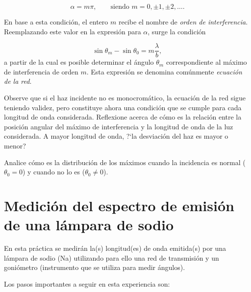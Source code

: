 \documentclass[epj]{svjour}
\begin{document}
\begin{equation}
    \alpha = m \pi, \quad \quad \text{siendo } m = 0, \pm 1, \pm 2, \ldots.
\end{equation}

En base a esta condici\'on, el entero $m$ recibe el nombre de {\it orden de
interferencia}. Reemplazando este valor en la expresi\'on para $\alpha$, 
surge la condici\'on

\begin{equation}
    \sin \theta_m - \sin \theta_0 = m \frac{\lambda}{b},
\end{equation}
a partir de la cual es posible determinar el \'angulo $\theta_m$ 
correspondiente al m\'aximo de interferencia de orden $m$. Esta expresi\'on
se denomina com\'unmente {\it ecuaci\'on de la red}. 

Observe que si el haz incidente no es monocrom\'atico, la ecuaci\'on de la
red sigue teniendo validez, pero constituye ahora una condici\'on que se
cumple para cada longitud de onda considerada. Reflexione acerca de c\'omo es
la relaci\'on entre la posici\'on angular del m\'aximo de interferencia y la
longitud de onda de la luz considerada. A mayor longitud de onda, ?`la 
desviaci\'on del haz es mayor o menor?

Analice c\'omo es la distribuci\'on de los m\'aximos cuando la incidencia 
es normal ($\theta_0 = 0$) y cuando no lo es ($\theta_0 \neq 0$). 

\section{Medici\'on del espectro de emisi\'on de una l\'ampara de sodio}

En esta pr\'actica se medir\'an la(s) longitud(es) de onda emitida(s) por una
l\'ampara de sodio (Na) utilizando para ello una red de transmisi\'on y un 
goni\'ometro (instrumento que se utiliza para medir \'angulos).

Los pasos importantes a seguir en esta experiencia son:
\end{document}
